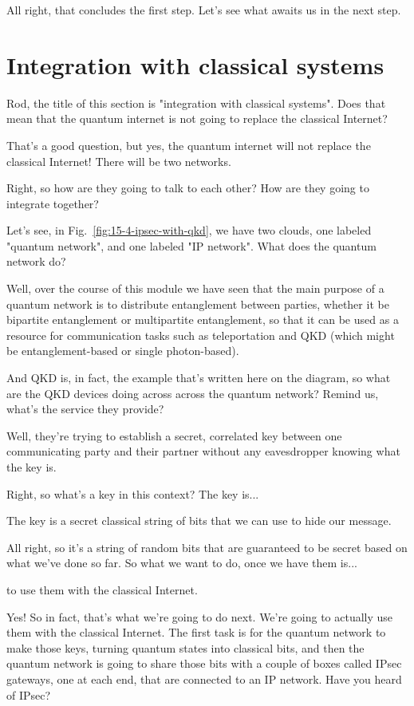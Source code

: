 All right, that concludes the first step. Let's see what awaits us in the next step.

\section{Integration with classical systems}
\label{sec:classical-integration}

\mmm Rod, the title of this section is "integration with classical systems". Does that mean that the quantum internet is not going to replace the classical Internet?

\rrr That's a good question, but yes, the quantum internet will not replace the classical Internet! There will be two networks.

\mmm Right, so how are they going to talk to each other? How are they going to integrate together?

\rrr Let's see, in Fig.~\ref{fig:15-4-ipsec-with-qkd}, we have two clouds, one labeled "quantum network", and one labeled "IP network". What does the quantum network do?

\mmm Well, over the course of this module we have seen that the main purpose of a quantum network is to distribute entanglement between parties, whether it be bipartite entanglement or multipartite entanglement, so that it can be used as a resource for communication tasks such as teleportation and QKD (which might be entanglement-based or single photon-based).

\rrr And QKD is, in fact, the example that's written here on the diagram, so what are the QKD devices doing across across the quantum network? Remind us, what's the service they provide?

\mmm Well, they're trying to establish a secret, correlated key between one communicating party and their partner without any eavesdropper knowing what the key is.

\rrr Right, so what's a key in this context? The key is...

\mmm The key is a secret classical string of bits that we can use to hide our message.

\rrr All right, so it's a string of random bits that are guaranteed to be secret based on what we've done so far. So what we want to do, once we have them is...

\mmm to use them with the classical Internet.

\rrr Yes! So in fact, that's what we're going to do next. We're going to actually use them with the classical Internet. The first task is for the quantum network to make those keys, turning quantum states into classical bits, and then the quantum network is going to share those bits with a couple of boxes called IPsec gateways, one at each end, that are connected to an IP network. Have you heard of IPsec?

